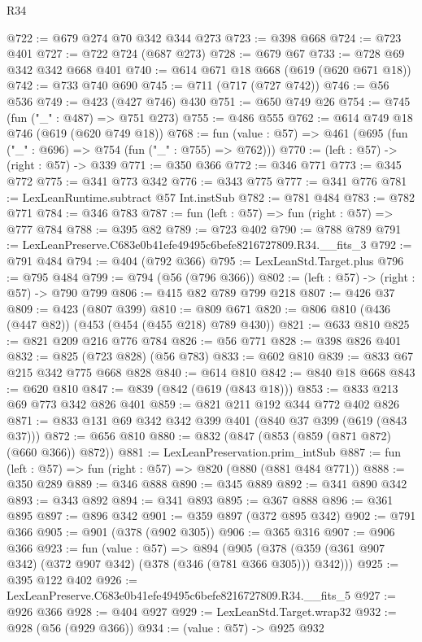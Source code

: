 \begin{lexlean}{R34}
\begin{coremodule}
@722 := @679 @274 @70 @342 @344 @273
@723 := @398 @668
@724 := @723 @401
@727 := @722 @724 (@687 @273)
@728 := @679 @67
@733 := @728 @69 @342 @342 @668 @401
@740 := @614 @671 @18 @668 (@619 (@620 @671 @18))
@742 := @733 @740 @690
@745 := @711 (@717 (@727 @742))
@746 := @56 @536
@749 := @423 (@427 @746) @430
@751 := @650 @749 @26
@754 := @745 (fun ("_" : @487) => @751 @273)
@755 := @486 @555
@762 := @614 @749 @18 @746 (@619 (@620 @749 @18))
@768 := fun (value : @57) => @461 (@695 (fun ("_" : @696) => @754 (fun ("_" : @755) => @762)))
@770 := (left : @57) -> (right : @57) -> @339
@771 := @350 @366
@772 := @346 @771
@773 := @345 @772
@775 := @341 @773 @342
@776 := @343 @775
@777 := @341 @776
@781 := LexLeanRuntime.subtract @57 Int.instSub
@782 := @781 @484
@783 := @782 @771
@784 := @346 @783
@787 := fun (left : @57) => fun (right : @57) => @777 @784
@788 := @395 @82
@789 := @723 @402
@790 := @788 @789
@791 := LexLeanPreserve.C683e0b41efe49495c6befe8216727809.R34.__fits_3
@792 := @791 @484
@794 := @404 (@792 @366)
@795 := LexLeanStd.Target.plus
@796 := @795 @484
@799 := @794 (@56 (@796 @366))
@802 := (left : @57) -> (right : @57) -> @790 @799
@806 := @415 @82 @789 @799 @218
@807 := @426 @37
@809 := @423 (@807 @399)
@810 := @809 @671
@820 := @806 @810 (@436 (@447 @82)) (@453 (@454 (@455 @218) @789 @430))
@821 := @633 @810
@825 := @821 @209 @216 @776 @784
@826 := @56 @771
@828 := @398 @826 @401
@832 := @825 (@723 @828) (@56 @783)
@833 := @602 @810
@839 := @833 @67 @215 @342 @775 @668 @828
@840 := @614 @810
@842 := @840 @18 @668
@843 := @620 @810
@847 := @839 (@842 (@619 (@843 @18)))
@853 := @833 @213 @69 @773 @342 @826 @401
@859 := @821 @211 @192 @344 @772 @402 @826
@871 := @833 @131 @69 @342 @342 @399 @401 (@840 @37 @399 (@619 (@843 @37)))
@872 := @656 @810
@880 := @832 (@847 (@853 (@859 (@871 @872) (@660 @366)) @872))
@881 := LexLeanPreservation.prim_intSub
@887 := fun (left : @57) => fun (right : @57) => @820 (@880 (@881 @484 @771))
@888 := @350 @289
@889 := @346 @888
@890 := @345 @889
@892 := @341 @890 @342
@893 := @343 @892
@894 := @341 @893
@895 := @367 @888
@896 := @361 @895
@897 := @896 @342
@901 := @359 @897 (@372 @895 @342)
@902 := @791 @366
@905 := @901 (@378 (@902 @305))
@906 := @365 @316
@907 := @906 @366
@923 := fun (value : @57) =>
  @894 (@905 (@378 (@359 (@361 @907 @342) (@372 @907 @342) (@378 (@346 (@781 @366 @305))) @342)))
@925 := @395 @122 @402
@926 := LexLeanPreserve.C683e0b41efe49495c6befe8216727809.R34.__fits_5
@927 := @926 @366
@928 := @404 @927
@929 := LexLeanStd.Target.wrap32
@932 := @928 (@56 (@929 @366))
@934 := (value : @57) -> @925 @932

\end{coremodule}
\end{lexlean}
